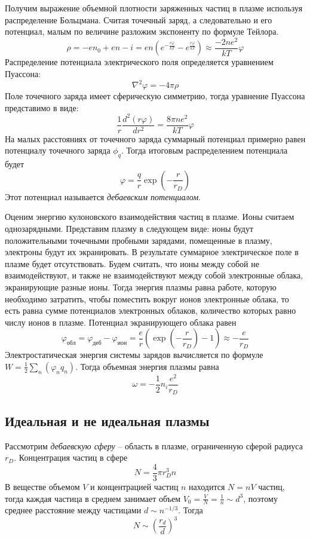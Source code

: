 Получим выражение объемной плотности заряженных частиц в плазме используя распределение Больцмана. Считая точечный заряд, а следовательно и его потенциал, малым по величине разложим экспоненту по формуле Тейлора.
$$\rho = -e n_0 + e n-i = en \left( e^{-\frac{e\varphi}{kT}} - e^{\frac{e \varphi}{kT}} \right) \approx \frac{-2 ne^2}{kT} \varphi$$
Распределение потенциала электрического поля определяется уравнением Пуассона:
$$
\nabla^2 \varphi = - 4 \pi \rho
$$
Поле точечного заряда имеет сферическую симметрию, тогда уравнение Пуассона представимо в виде:
$$
\frac{1}{r}\frac{d^2(r \varphi)}{d r^2} = \frac{8 \pi n e^2}{kT} \varphi
$$
На малых расстояниях от точечного заряда суммарный потенциал примерно равен потенциалу точечного заряда $\phi_q$. Тогда итоговым распределением потенциала будет
$$
\varphi = \frac{q}{r} \exp \left( -\frac{r}{r_D} \right)
$$
Этот потенциал называется \textit{дебаевским потенциалом}.

Оценим энергию кулоновского взаимодействия частиц в плазме. Ионы считаем однозарядными. Представим плазму в следующем виде: ионы будут положительными точечными пробными зарядами, помещенные в плазму, электроны будут их экранировать. В результате суммарное электрическое поле в плазме будет отсутствовать. Будем считать, что ионы между собой не взаимодействуют, и также не взаимодействуют между собой электронные облака, экранирующие разные ионы. Тогда энергия плазмы равна работе, которую необходимо затратить, чтобы поместить вокруг ионов электронные облака, то есть равна сумме потенциалов электронных облаков, количество которых равно числу ионов в плазме. Потенциал экранирующего облака равен
$$
\varphi_{обл} = \varphi_{деб} - \varphi_{ион} = \frac{e}{r} \left(\exp \left( -\frac{r}{r_D} \right) - 1\right) \approx - \frac{e}{r_D}
$$
Электростатическая энергия системы зарядов вычисляется по формуле $W = \frac{1}{2} \sum_n (\varphi_n q_n)$. Тогда объемная энергия плазмы равна
$$
\omega = - \frac{1}{2} n_i \frac{e^2}{r_D}
$$

\subsection*{Идеальная и не идеальная плазмы}

Рассмотрим \textit{дебаевскую сферу} -- область в плазме, ограниченную сферой радиуса $r_D$. Концентрация частиц в сфере
$$
N = \frac{4}{3} \pi r_D^3 n
$$
В веществе объемом $V$ и концентрацией частиц $n$ находится $N = nV$ частиц, тогда каждая частица в среднем занимает объем $V_0 = \frac{V}{N} = \frac{1}{n} \sim d^3$, поэтому среднее расстояние между частицами $d \sim n^{-1/3}$. Тогда 
$$N \sim \left( \frac{r_d}{d} \right)^3$$

